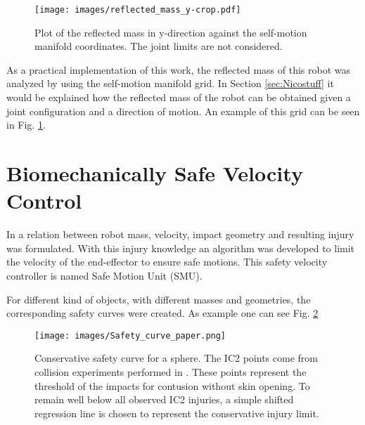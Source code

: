 \begin{figure}[!htb]
	\centerline{
		\texttt{[image: images/reflected\_mass\_y-crop.pdf]}}
	\caption{Plot of the reflected mass in y-direction against the self-motion 		manifold coordinates. The joint limits are not considered.}
	\label{fig:reflected_mass_y-crop}
\end{figure}

As a practical implementation of this work, the reflected mass of this robot was analyzed by using the self-motion manifold grid. In Section \ref{sec:Nicostuff} it would be explained how the reflected mass of the robot can be obtained given a joint configuration and a direction of motion. 
An example of this grid can be seen in Fig.	\ref{fig:reflected_mass_y-crop}.


 

\section{Biomechanically Safe Velocity Control}
\label{sec:Samistuff}

In \cite{sammi_paper} a relation between robot mass, velocity, impact geometry
and resulting injury was formulated. With this injury knowledge an algorithm was developed to limit the velocity of the end-effector to ensure safe motions. This safety velocity controller  is named Safe Motion Unit (SMU). 

For different kind of objects, with different masses and geometries, the corresponding safety curves were created. As example one can see Fig. \ref{fig:Safety_curve_paper}


\begin{figure}[htb]
	\centerline{
		\texttt{[image: images/Safety\_curve\_paper.png]}}
	\caption{Conservative safety curve for a sphere. The IC2 points come from collision experiments performed in \cite{sammi_paper}. These points represent the threshold of the impacts for contusion without skin opening. To remain well below all observed IC2 injuries, a simple shifted regression line is chosen to represent the conservative injury limit.}
	\label{fig:Safety_curve_paper}
\end{figure}
 

